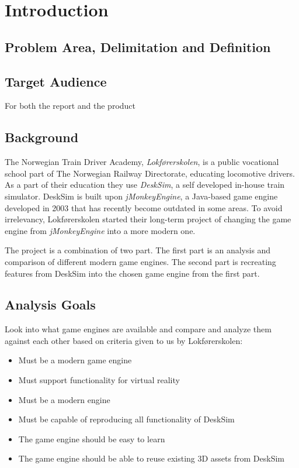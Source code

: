 \chapter{Introduction}

\section{Problem Area, Delimitation and Definition}

\section{Target Audience}
For both the report and the product

\section{Background}

The Norwegian Train Driver Academy, \textit{Lokførerskolen}, is a public vocational school part of The Norwegian Railway Directorate, educating locomotive drivers. As a part of their education they use \textit{DeskSim}, a self developed in-house train simulator. DeskSim is built upon \textit{jMonkeyEngine}, a Java-based game engine developed in 2003 that has recently become outdated in some areas. To avoid irrelevancy, Lokførerskolen started their long-term project of changing the game engine from \textit{jMonkeyEngine} into a more modern one.

The project is a combination of two part. The first part is an analysis and comparison of different modern game engines. The second part is recreating features from DeskSim into the chosen game engine from the first part.

\section{Analysis Goals}
Look into what game engines are available and compare and analyze them against each other based on criteria given to us by Lokførerskolen: 
\begin{itemize}
    \item Must be a modern game engine
    \item Must support functionality for virtual reality
    \item Must be a modern engine
    \item Must be capable of reproducing all functionality of DeskSim
    \item The game engine should be easy to learn
    \item The game engine should be able to reuse existing 3D assets from DeskSim
\end{itemize}

